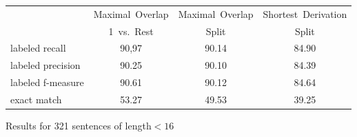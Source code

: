 
\begin{tabular}{l | ccc}
&Maximal~Overlap&Maximal~Overlap&Shortest~Derivation\\
& 1~vs.~Rest& Split&Split\\\hline
labeled recall&90,97&90.14&84.90\\
labeled precision&90.25&90.10&84.39\\
labeled f-measure&90.61&90.12&84.64\\
exact match&53.27&49.53&39.25\\
\end{tabular}

\caption{Results for 321 sentences of length$<16$}
